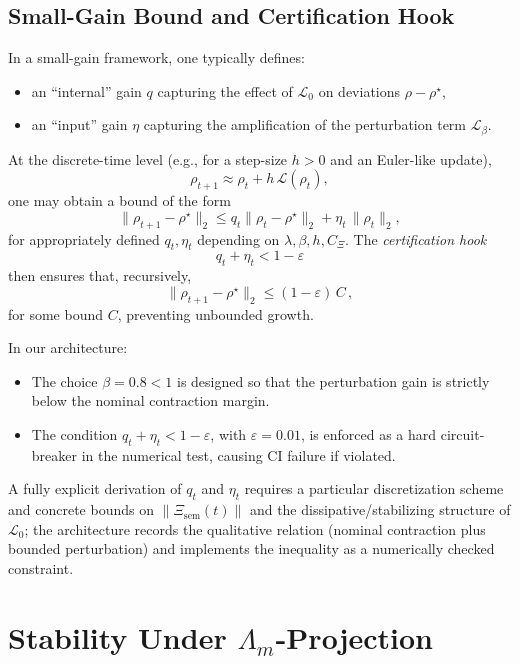 \documentclass[11pt]{article}
\begin{document}
\subsection{Small-Gain Bound and Certification Hook}

In a small-gain framework, one typically defines:
\begin{itemize}[nosep]
  \item an ``internal'' gain \(q\) capturing the effect of \(\mathcal{L}_0\) on deviations \(\rho - \rho^\star\),
  \item an ``input'' gain \(\eta\) capturing the amplification of the perturbation term \(\mathcal{L}_\beta\).
\end{itemize}

At the discrete-time level (e.g., for a step-size \(h > 0\) and an Euler-like update),
\[
\rho_{t+1} \approx \rho_t + h\,\mathcal{L}(\rho_t),
\]
one may obtain a bound of the form
\begin{equation}
  \|\rho_{t+1} - \rho^\star\|_2
  \le q_t \|\rho_t - \rho^\star\|_2 + \eta_t\,\|\rho_t\|_2,
\end{equation}
for appropriately defined \(q_t,\eta_t\) depending on \(\lambda, \beta, h, C_{\Xi}\). The \emph{certification hook}
\[
q_t + \eta_t < 1 - \varepsilon
\]
then ensures that, recursively,
\[
\|\rho_{t+1} - \rho^\star\|_2
\le (1 - \varepsilon)\,C\,,
\]
for some bound \(C\), preventing unbounded growth.

In our architecture:
\begin{itemize}[nosep]
  \item The choice \(\beta = 0.8 < 1\) is designed so that the perturbation gain is strictly below the nominal contraction margin.
  \item The condition \(q_t + \eta_t < 1 - \varepsilon\), with \(\varepsilon = 0.01\), is enforced as a hard circuit-breaker in the numerical test, causing CI failure if violated.
\end{itemize}

A fully explicit derivation of \(q_t\) and \(\eta_t\) requires a particular discretization scheme and concrete bounds on \(\|\Xi_{\mathrm{sem}}(t)\|\) and the dissipative/stabilizing structure of \(\mathcal{L}_0\); the architecture records the qualitative relation (nominal contraction plus bounded perturbation) and implements the inequality as a numerically checked constraint.

\section{Stability Under \texorpdfstring{$\Lambda_m$}{Λm}-Projection}
\end{document}

